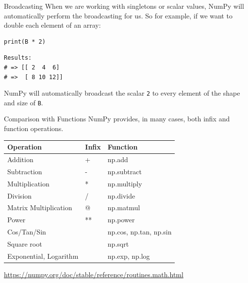\documentclass[10pt]{beamer}
\begin{document}
\begin{frame}[label={sec:orgd3cf350},fragile]{Broadcasting}
 When we are working with singletons or scalar values, NumPy will automatically
perform the broadcasting for us. So for example, if we want to double each element of
an array:

\begin{verbatim}
print(B * 2)
\end{verbatim}

\begin{verbatim}
Results: 
# => [[ 2  4  6]
# =>  [ 8 10 12]]
\end{verbatim}


NumPy will automatically broadcast the scalar \texttt{2} to every element of the shape and
size of \texttt{B}.
\end{frame}

\begin{frame}[label={sec:orgc047d57}]{Comparison with Functions}
NumPy provides, in many cases, both infix and function operations.

\begin{center}
\begin{tabular}{lll}
Operation & Infix & Function\\
\hline
Addition & + & np.add\\
Subtraction & - & np.subtract\\
Multiplication & * & np.multiply\\
Division & / & np.divide\\
Matrix Multiplication & @ & np.matmul\\
Power & ** & np.power\\
Cos/Tan/Sin &  & np.cos, np.tan, np.sin\\
Square root &  & np.sqrt\\
Exponential, Logarithm &  & np.exp, np.log\\
\end{tabular}
\end{center}

\url{https://numpy.org/doc/stable/reference/routines.math.html}
\end{frame}
\end{document}
